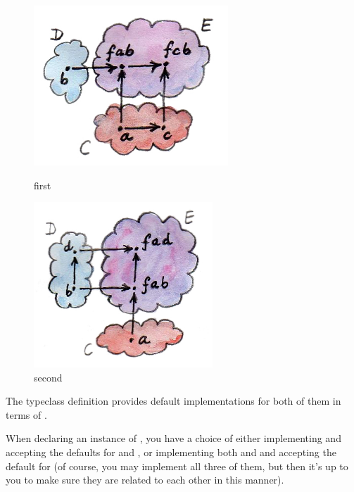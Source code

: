 \begin{figure}[H]
  \centering
  \begin{minipage}{0.45\textwidth}
      \centering
      \includegraphics[width=0.65\textwidth]{images/first.jpg} %
      \caption{first}
  \end{minipage}\hfill
  \begin{minipage}{0.45\textwidth}
      \centering
      \includegraphics[width=0.6\textwidth]{images/second.jpg} %
      \caption{second}
  \end{minipage}
\end{figure}

\noindent
The typeclass definition provides default implementations for both of
them in terms of .

When declaring an instance of , you have a choice of
either implementing  and accepting the defaults for
 and , or implementing both 
and  and accepting the default for  (of
course, you may implement all three of them, but then it's up to you to
make sure they are related to each other in this manner).

